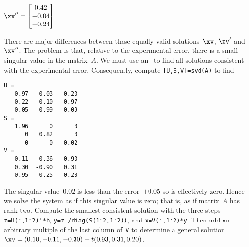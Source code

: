 \begin{example}
\begin{enumerate}
\begin{solution}
\begin{itemize}
\(\xv''=\begin{bmatrix} 0.42\\-0.04\\-0.24 \end{bmatrix}\)
\end{itemize}
There are major differences between these equally valid solutions~\(\xv\), \(\xv'\) and~\(\xv''\).
The problem is that, relative to the experimental error, there is a small singular value in the matrix~\(A\).
We must use an \svd\ to find all solutions consistent with the experimental error. 
Consequently, compute \verb|[U,S,V]=svd(A)| to find \twodp
\begin{verbatim}
U =
  -0.97   0.03  -0.23
   0.22  -0.10  -0.97
  -0.05  -0.99   0.09
S =
   1.96      0      0
      0   0.82      0
      0      0   0.02
V =
   0.11   0.36   0.93
   0.30  -0.90   0.31
  -0.95  -0.25   0.20
\end{verbatim}
The singular value~\(0.02\) is less than the error~\(\pm0.05\) so is effectively zero.
Hence we solve the system as if this singular value is zero; that is, as if matrix~\(A\) has rank two.
Compute the smallest consistent solution with the three steps \verb|z=U(:,1:2)'*b|, \verb|y=z./diag(S(1:2,1:2))|, and \verb|x=V(:,1:2)*y|.
Then add an arbitrary multiple of the last column of~\verb|V| to determine a general solution \(\xv=(0.10,-0.11,-0.30)+t(0.93,0.31,0.20)\).
\end{solution}



\end{enumerate}
\end{example}
